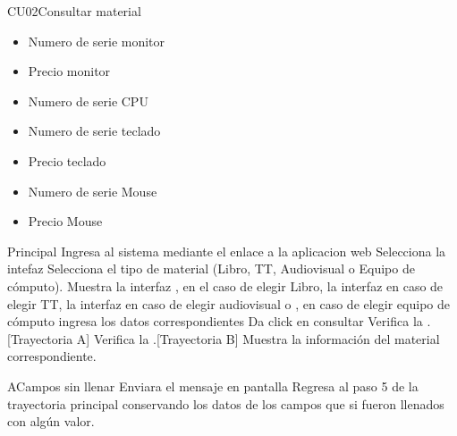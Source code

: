 \begin{UseCase}{CU02}{Consultar material}
{\begin{itemize}
			\item Numero de serie monitor 
			\item Precio monitor
			\item Numero de serie CPU
			\item Numero de serie teclado
			\item Precio teclado
			\item Numero de serie Mouse
			\item Precio Mouse						
	
		\end{itemize}				
		}

	\end{UseCase}
	\begin{UCtrayectoria}{Principal}
	\UCpaso[\UCactor] Ingresa al sistema mediante el enlace a la aplicacion web
	 \UCpaso[\UCactor] Selecciona la intefaz 
	  \UCpaso[\UCactor] Selecciona el tipo de material (Libro, TT, Audiovisual o Equipo de cómputo).
	 \UCpaso[\UCsist]Muestra la interfaz , en el caso de elegir Libro, la interfaz  en caso de elegir TT, la interfaz  en caso de elegir audiovisual o , en caso de elegir equipo de cómputo
	  \UCpaso[\UCactor] ingresa los datos correspondientes
	  \UCpaso[\UCactor] Da click en consultar
	   \UCpaso[\UCsist] Verifica la  .[Trayectoria A]
	    \UCpaso[\UCsist] Verifica la .[Trayectoria B]
	    \UCpaso[\UCsist] Muestra la información del material correspondiente.


	\end{UCtrayectoria}
		\begin{UCtrayectoriaA}{A}{Campos sin llenar}
			\UCpaso[\UCsist] Enviara el  mensaje en pantalla 
			\UCpaso[\UCsist] Regresa al paso 5 de la trayectoria principal conservando los datos de los campos que si fueron llenados con algún valor.
		\end{UCtrayectoriaA}
		
